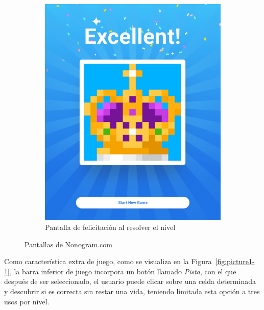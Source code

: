 \begin{figure}[h!]
\begin{subfigure}[b]{0.45\linewidth}
     \includegraphics[width=\linewidth]{images/picturecross2.png}
     \caption{Pantalla de felicitación al resolver el nivel}
     \label{fig:picture1-2}
   \end{subfigure}
   \caption{Pantallas de Nonogram.com}
   \label{fig:picture1}
 \end{figure}

Como característica extra de juego, como se visualiza en la Figura~\ref{fig:picture1-1}, la barra inferior de juego incorpora un botón llamado \textit{Pista}, 
con el que después de ser seleccionado, 
el usuario puede clicar sobre una celda determinada y descubrir si es correcta sin restar una vida, teniendo limitada esta opción a tres usos por nivel.

